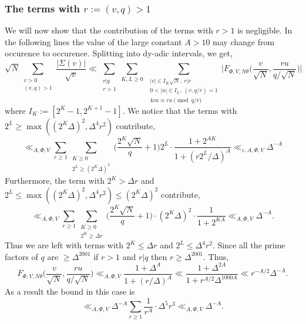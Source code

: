 \documentclass[12pt,reqno]{amsart}
\theoremstyle{plain}
\numberwithin{equation}{section}
\numberwithin{figure}{section}
\theoremstyle{plain}
\theoremstyle{definition}
\theoremstyle{remark}
\begin{document}
\subsubsection{The terms with $r := (v,q) > 1$}
We will now show that the contribution of the terms with $r > 1$ is negligible. 
In the following lines the value of the large constant $A > 10$ may change from occurence to occurence. 
Splitting into dy-adic intervals, we get, 
$$
\sqrt{N} \sum_{\substack{v > 0 \\ (v,q) > 1}} \frac{|\Sigma(v)|}{\sqrt{v}} \ll \sum_{\substack{r | q \\ r > 1}} \sum_{K, L \geq 0} \ \sum_{\substack{|v| \in I_K \sqrt{N}, \ r | v \\ 0 < |u| \in I_L, \ (v,q / r) = 1 \\ 4 v a \equiv r u \pmod{q / r}}} \Big | F_{\Phi, V, N \theta} \Big ( \frac{v}{\sqrt{N}}, \frac{r u}{q / \sqrt{N}} \Big ) \Big |   
$$
where $I_K := [2^K - 1, 2^{K + 1} -1]$. We notice that the terms with $2^L \geq \max ((2^K \Delta)^{2},\Delta^4 r^2)$ contribute, 
$$
\ll_{A, \Phi, V} \sum_{r \geq 1} \sum_{\substack{K \geq 0 \\ 2^L \geq (2^K \Delta)^{2}}} \Big ( \frac{2^K \sqrt{N}}{q} + 1 \Big ) 2^{L} \cdot \frac{1 + 2^{A K}}{1 + (r 2^L / \Delta)^A} \ll_{\varepsilon, A, \Phi, V} \Delta^{-A}
$$
Furthermore, the term with $2^K > \Delta r$ and $2^L \leq \max((2^{K} \Delta)^2, \Delta^4 r^2) \leq (2^K \Delta)^2$ contribute, 
$$
\ll_{A, \Phi, V} \sum_{r \geq 1} \sum_{\substack{K \geq 0 \\ 2^K \geq \Delta r}} \Big ( \frac{2^K \sqrt{N}}{q} + 1 \Big ) \cdot (2^K \Delta)^{2} \cdot \frac{1}{1 + 2^{K A}}  \ll_{A,\Phi, V} \Delta^{-A}.
$$
Thus we are left with terms with $2^K \leq \Delta r$ and $2^L \leq \Delta^4 r^2$. Since all the prime factors of $q$ are $\geq \Delta^{2001}$ if $r > 1$ and $r | q$ then $r \geq \Delta^{2001}$. Thus, 
$$
F_{\Phi, V, N \theta} \Big ( \frac{v}{\sqrt{N}}, \frac{r u}{q / \sqrt{N}} \Big ) \ll_{A, \Phi, V} \frac{1 + \Delta^A}{1 + (r / \Delta)^A} \ll \frac{1 + \Delta^{2 A}}{1 + r^{A / 2} \Delta^{1000 A}} \ll r^{-A / 2} \Delta^{-A}.
$$
As a result the bound in this case is
$$
\ll_{A, \Phi, V} \Delta^{-A} \sum_{r \geq 1} \frac{1}{r^A} \cdot \Delta^5 r^3  \ll_{A, \Phi, V} \Delta^{-A}.
$$

\end{document}
